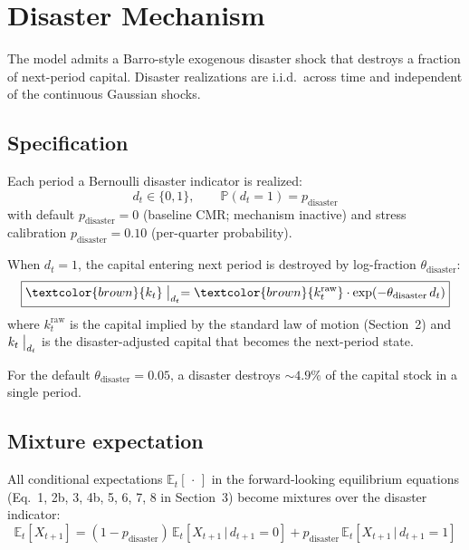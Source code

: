 \section{Disaster Mechanism}
\label{sec:disaster}

The model admits a Barro-style exogenous disaster shock that destroys a
fraction of next-period capital. Disaster realizations are i.i.d.\ across
time and independent of the continuous Gaussian shocks.

\subsection{Specification}

Each period a Bernoulli disaster indicator is realized:
\begin{equation*}
  d_t \in \{0, 1\}, \qquad
  \mathbb{P}(d_t = 1) = p_{\text{disaster}}
\end{equation*}
with default $p_{\text{disaster}} = 0$ (baseline CMR; mechanism
inactive) and stress calibration $p_{\text{disaster}} = 0.10$
(per-quarter probability).

When $d_t = 1$, the capital entering next period is destroyed by
log-fraction $\theta_{\text{disaster}}$:
\begin{equation*}
  \boxed{\textcolor{brown}{k_t}\bigm|_{d_t}
    = \textcolor{brown}{k_t^{\text{raw}}}
      \cdot \exp(-\theta_{\text{disaster}}\, d_t)}
\end{equation*}
where $k_t^{\text{raw}}$ is the capital implied by the standard law of
motion (Section~2) and $k_t\bigm|_{d_t}$ is the disaster-adjusted
capital that becomes the next-period state.

For the default $\theta_{\text{disaster}} = 0.05$, a disaster destroys
${\sim}4.9\%$ of the capital stock in a single period.

\subsection{Mixture expectation}

All conditional expectations $\mathbb{E}_t[\,\cdot\,]$ in the
forward-looking equilibrium equations (Eq.~1, 2b, 3, 4b, 5, 6, 7, 8 in
Section~3) become mixtures over the disaster indicator:
\begin{equation*}
  \boxed{\mathds{E}_t[X_{t+1}]
    = (1 - p_{\text{disaster}})\,
      \mathds{E}_t\!\left[X_{t+1} \,\big|\, d_{t+1} = 0\right]
    + p_{\text{disaster}}\,
      \mathds{E}_t\!\left[X_{t+1} \,\big|\, d_{t+1} = 1\right]}
\end{equation*}

